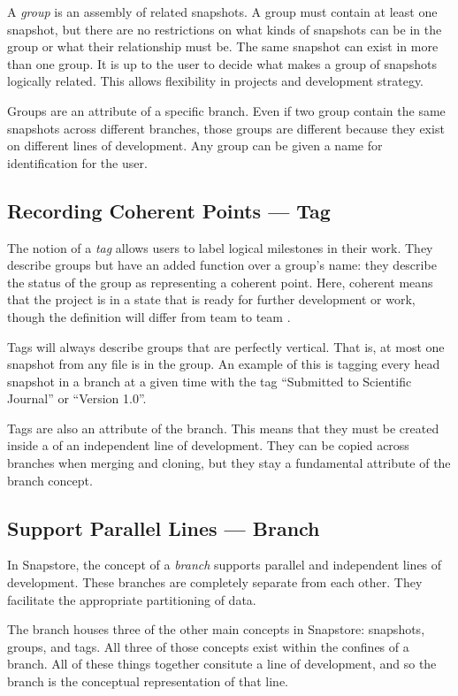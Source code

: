 A \textit{group} is an assembly of related snapshots. A group must contain at least one snapshot, but there are no restrictions on what kinds of snapshots can be in the group or what their relationship must be. The same snapshot can exist in more than one group. It is up to the user to decide what makes a group of snapshots logically related. This allows flexibility in projects and development strategy.

Groups are an attribute of a specific branch. Even if two group contain the same snapshots across different branches, those groups are different because they exist on different lines of development. Any group can be given a name for identification for the user.

\subsection{Recording Coherent Points --- Tag}

The notion of a \textit{tag} allows users to label logical milestones in their work. They describe groups but have an added function over a group's name: they describe the status of the group as representing a coherent point. Here, coherent means that the project is in a state that is ready for further development or work, though the definition will differ from team to team \cite{RossoJackson}. 

Tags will always describe groups that are perfectly vertical. That is, at most one snapshot from any file is in the group. An example of this is tagging every head snapshot in a branch at a given time with the tag ``Submitted to Scientific Journal'' or ``Version 1.0''.

Tags are also an attribute of the branch. This means that they must be created inside a of an independent line of development. They can be copied across branches when merging and cloning, but they stay a fundamental attribute of the branch concept.

\subsection{Support Parallel Lines --- Branch}

In Snapstore, the concept of a \textit{branch} supports parallel and independent lines of development. These branches are completely separate from each other. They facilitate the appropriate partitioning of data.

The branch houses three of the other main concepts in Snapstore: snapshots, groups, and tags. All three of those concepts exist within the confines of a branch. All of these things together consitute a line of development, and so the branch is the conceptual representation of that line.

